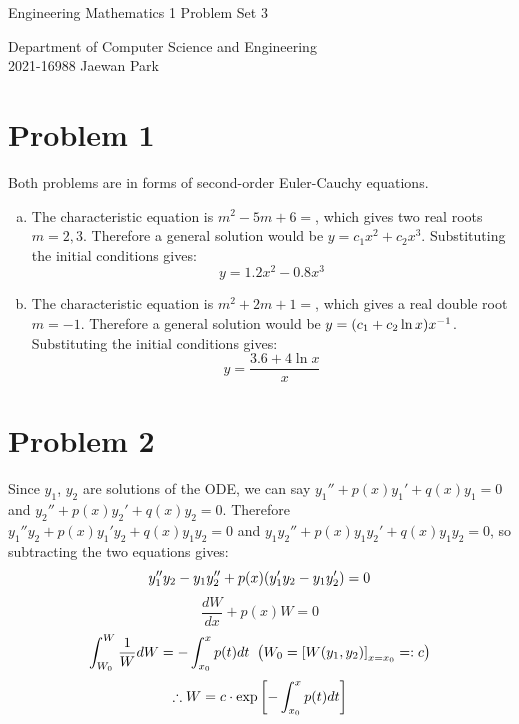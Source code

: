 \documentclass[10pt]{article}
\begin{document}
\begin{center}
    {\LARGE Engineering Mathematics 1 Problem Set 3} \\
\end{center}
\begin{flushright}
    Department of Computer Science and Engineering \\
    2021-16988 Jaewan Park
\end{flushright}

\section*{Problem 1}
Both problems are in forms of second-order Euler-Cauchy equations.
\begin{enumerate}[(a), leftmargin=*]
    \item The characteristic equation is $m^2 - 5m + 6 = $, which gives two real roots  $m = 2, 3$.
    Therefore a general solution would be $y = c_1x^2 + c_2x^3$. Substituting the initial conditions gives:
    $$y = 1.2x^2 - 0.8x^3$$
    \item The characteristic equation is $m^2 + 2m + 1 = $, which gives a real double root  $m = -1$.
    Therefore a general solution would be $y = \qty(c_1 + c_2\ln{x})x^{-1}$. Substituting the initial conditions gives:
    $$y = \frac{3.6 + 4\ln{x}}{x}$$
\end{enumerate}

\section*{Problem 2}
Since $y_1$, $y_2$ are solutions of the ODE, we can say $y_1'' + p(x)y_1' + q(x)y_1 = 0$ and $y_2'' + p(x)y_2' + q(x)y_2 = 0$.
Therefore $y_1''y_2 + p(x)y_1'y_2 + q(x)y_1y_2 = 0$ and $y_1y_2'' + p(x)y_1y_2' + q(x)y_1y_2 = 0$, so subtracting the two equations gives:
$$y_1''y_2 - y_1y_2'' + p(x)\qty(y_1'y_2 - y_1y_2') = 0$$
$$\frac{dW}{dx} + p(x)W = 0$$
$$\int_{W_0}^{W}\frac{1}{W}dW = -\int_{x_0}^{x}p(t)dt \;\; \qty(W_0 = \qty[W\qty(y_1, y_2)]_{x=x_0} =: c)$$
$$\therefore W = c \cdot \exp\qty[-\int_{x_0}^{x}p(t)dt]$$
\end{document}
